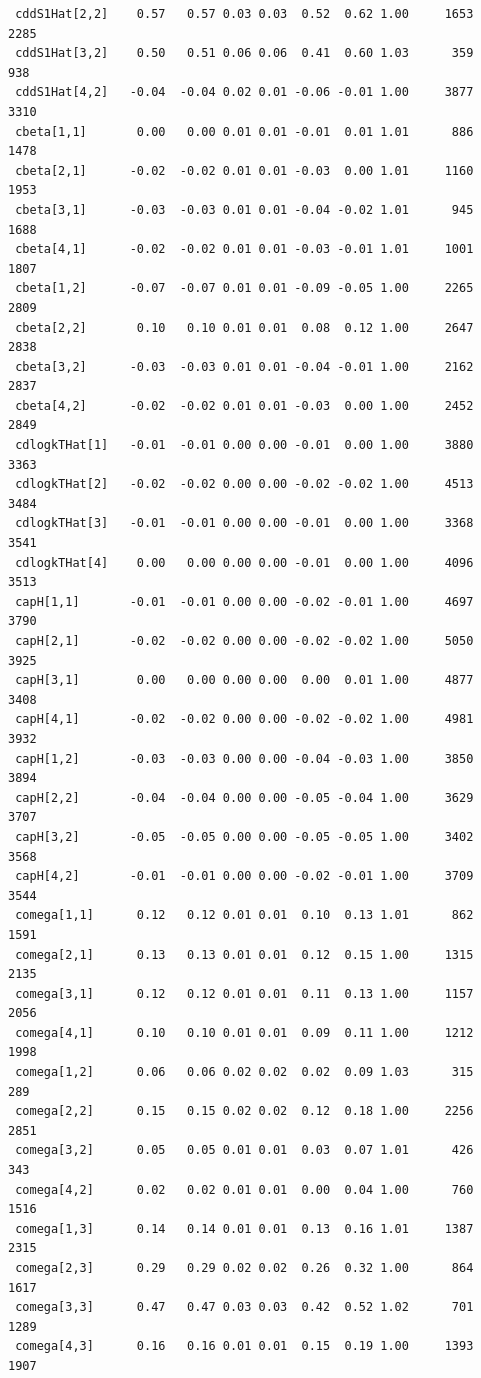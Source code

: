 \documentclass[
]{article}
\begin{document}
\begin{verbatim}
 cddS1Hat[2,2]    0.57   0.57 0.03 0.03  0.52  0.62 1.00     1653     2285
 cddS1Hat[3,2]    0.50   0.51 0.06 0.06  0.41  0.60 1.03      359      938
 cddS1Hat[4,2]   -0.04  -0.04 0.02 0.01 -0.06 -0.01 1.00     3877     3310
 cbeta[1,1]       0.00   0.00 0.01 0.01 -0.01  0.01 1.01      886     1478
 cbeta[2,1]      -0.02  -0.02 0.01 0.01 -0.03  0.00 1.01     1160     1953
 cbeta[3,1]      -0.03  -0.03 0.01 0.01 -0.04 -0.02 1.01      945     1688
 cbeta[4,1]      -0.02  -0.02 0.01 0.01 -0.03 -0.01 1.01     1001     1807
 cbeta[1,2]      -0.07  -0.07 0.01 0.01 -0.09 -0.05 1.00     2265     2809
 cbeta[2,2]       0.10   0.10 0.01 0.01  0.08  0.12 1.00     2647     2838
 cbeta[3,2]      -0.03  -0.03 0.01 0.01 -0.04 -0.01 1.00     2162     2837
 cbeta[4,2]      -0.02  -0.02 0.01 0.01 -0.03  0.00 1.00     2452     2849
 cdlogkTHat[1]   -0.01  -0.01 0.00 0.00 -0.01  0.00 1.00     3880     3363
 cdlogkTHat[2]   -0.02  -0.02 0.00 0.00 -0.02 -0.02 1.00     4513     3484
 cdlogkTHat[3]   -0.01  -0.01 0.00 0.00 -0.01  0.00 1.00     3368     3541
 cdlogkTHat[4]    0.00   0.00 0.00 0.00 -0.01  0.00 1.00     4096     3513
 capH[1,1]       -0.01  -0.01 0.00 0.00 -0.02 -0.01 1.00     4697     3790
 capH[2,1]       -0.02  -0.02 0.00 0.00 -0.02 -0.02 1.00     5050     3925
 capH[3,1]        0.00   0.00 0.00 0.00  0.00  0.01 1.00     4877     3408
 capH[4,1]       -0.02  -0.02 0.00 0.00 -0.02 -0.02 1.00     4981     3932
 capH[1,2]       -0.03  -0.03 0.00 0.00 -0.04 -0.03 1.00     3850     3894
 capH[2,2]       -0.04  -0.04 0.00 0.00 -0.05 -0.04 1.00     3629     3707
 capH[3,2]       -0.05  -0.05 0.00 0.00 -0.05 -0.05 1.00     3402     3568
 capH[4,2]       -0.01  -0.01 0.00 0.00 -0.02 -0.01 1.00     3709     3544
 comega[1,1]      0.12   0.12 0.01 0.01  0.10  0.13 1.01      862     1591
 comega[2,1]      0.13   0.13 0.01 0.01  0.12  0.15 1.00     1315     2135
 comega[3,1]      0.12   0.12 0.01 0.01  0.11  0.13 1.00     1157     2056
 comega[4,1]      0.10   0.10 0.01 0.01  0.09  0.11 1.00     1212     1998
 comega[1,2]      0.06   0.06 0.02 0.02  0.02  0.09 1.03      315      289
 comega[2,2]      0.15   0.15 0.02 0.02  0.12  0.18 1.00     2256     2851
 comega[3,2]      0.05   0.05 0.01 0.01  0.03  0.07 1.01      426      343
 comega[4,2]      0.02   0.02 0.01 0.01  0.00  0.04 1.00      760     1516
 comega[1,3]      0.14   0.14 0.01 0.01  0.13  0.16 1.01     1387     2315
 comega[2,3]      0.29   0.29 0.02 0.02  0.26  0.32 1.00      864     1617
 comega[3,3]      0.47   0.47 0.03 0.03  0.42  0.52 1.02      701     1289
 comega[4,3]      0.16   0.16 0.01 0.01  0.15  0.19 1.00     1393     1907

\end{verbatim}
\end{document}
